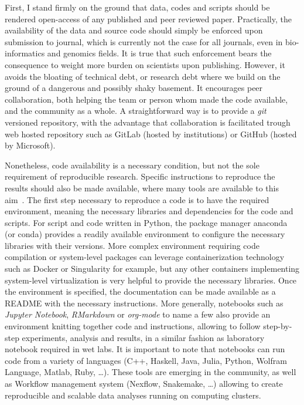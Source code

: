 First, I stand firmly on the ground that data, codes and scripts should be rendered open-access of any published and peer reviewed paper.
Practically, the availability of the data and source code should simply be enforced upon submission to journal, which is currently not the case for all journals, even in bio-informatics and genomics fields.
It is true that such enforcement bears the consequence to weight more burden on scientists upon publishing.
However, it avoids the bloating of technical debt, or research debt where we build on the ground of a dangerous and possibly shaky basement.
It encourages peer collaboration, both helping the team or person whom made the code available, and the community as a whole.
A straightforward way is to provide a \textit{git} versioned repository, with the advantage that collaboration is facilitated trough web hosted repository such as GitLab (hosted by institutions) or GitHub (hosted by Microsoft).

Nonetheless, code availability is a necessary condition, but not the sole requirement of reproducible research.
Specific instructions to reproduce the results should also be made available, where many tools are available to this aim~\citep{Wilson2014,Darriba2018}.
The first step necessary to reproduce a code is to have the required environment, meaning the necessary libraries and dependencies for the code and scripts.
For script and code written in Python, the package manager anaconda (or conda) provides a readily available environment to configure the necessary libraries with their versions.
More complex environment requiring code compilation or system-level packages can leverage containerization technology such as Docker or Singularity for example, but any other containers implementing system-level virtualization is very helpful to provide the necessary libraries.
Once the environment is specified, the documentation can be made available as a README with the necessary instructions.
More generally, notebooks such as \textit{Jupyter Notebook}, \textit{RMarkdown} or \textit{org-mode} to name a few also provide an environment knitting together code and instructions, allowing to follow step-by-step experiments, analysis and results, in a similar fashion as laboratory notebook required in wet labs.
It is important to note that notebooks can run code from a variety of languages (C++, Haskell, Java, Julia, Python, Wolfram Language, Matlab, Ruby, \ldots).
These tools are emerging in the community, as well as Workflow management system (Nexflow, Snakemake, \ldots) allowing to create reproducible and scalable data analyses running on computing clusters.

